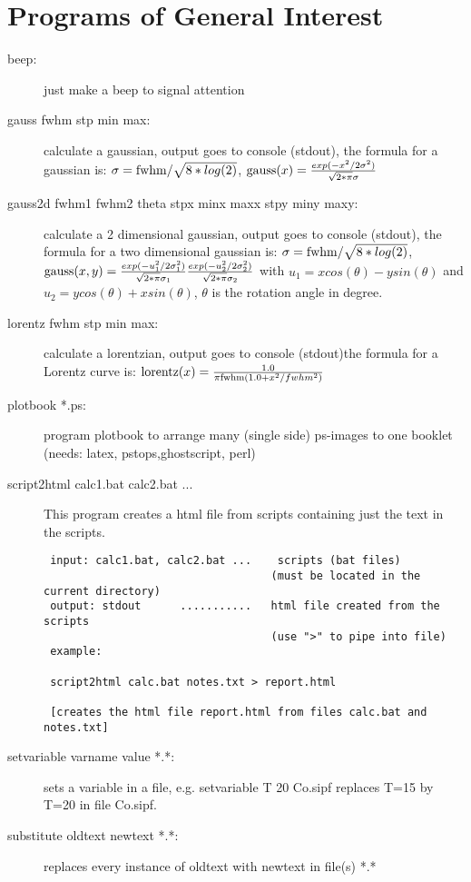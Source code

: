 \section{Programs of General Interest}

\begin{description}
\item [\prg beep:] just make a beep to signal attention 
\item [\prg gauss fwhm stp min max:] calculate a gaussian, output goes to console %
(stdout), the formula for a gaussian is:
$\sigma={\rm fwhm}/\sqrt{8*log(2)}$,
${\rm gauss}(x)=\frac{exp(-x^2/2 \sigma^2)}{\sqrt{2*\pi}\sigma}$
\item [\prg gauss2d fwhm1 fwhm2 theta  stpx minx maxx stpy miny maxy:] calculate a 2 dimensional gaussian, output goes to console %
(stdout), the formula for a two dimensional gaussian is:
$\sigma={\rm fwhm}/\sqrt{8*log(2)}$,
${\rm gauss}(x,y)=\frac{exp(-u_1^2/2 \sigma_1^2)}{\sqrt{2*\pi}\sigma_1}\frac{exp(-u_2^2/2 \sigma_2^2)}{\sqrt{2*\pi}\sigma_2}$ with $u_1=x cos(\theta)-ysin(\theta)$ and $u_2=y cos(\theta)+xsin(\theta)$,
$\theta$ is the rotation angle in degree.
\item [\prg lorentz fwhm stp min max:] calculate a lorentzian, output goes to %
console (stdout)the formula for a Lorentz curve is: 
${\rm lorentz}(x)=\frac{1.0}{\pi{\rm fwhm}(1.0+x^2/fwhm^2)}$
\item [\prg plotbook *.ps:] program plotbook to arrange many (single side) ps-images to one %
booklet (needs: latex, pstops,ghostscript, perl)
\item [\prg script2html calc1.bat calc2.bat ...] This program creates a html file from scripts containing just the text
 in the scripts.
\begin{verbatim}
 input: calc1.bat, calc2.bat ...    scripts (bat files)
                                   (must be located in the current directory)
 output: stdout      ...........   html file created from the scripts
                                   (use ">" to pipe into file)
 example:

 script2html calc.bat notes.txt > report.html

 [creates the html file report.html from files calc.bat and notes.txt]
\end{verbatim}
\item [\prg setvariable varname value *.*:]
sets a variable in a file, e.g. {\prg setvariable T 20 Co.sipf} replaces
T=15 by T=20 in file {\prg Co.sipf}.
\item [\prg substitute oldtext newtext *.*:] replaces every instance of %
oldtext with newtext in file(s) *.*
\end{description}


